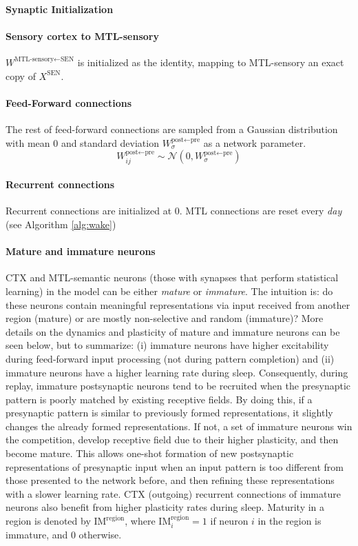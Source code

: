 \documentclass{article}
\begin{document}
\paragraph{Synaptic Initialization}
\paragraph{Sensory cortex to MTL-sensory}
$W^{\textrm{MTL-sensory}\leftarrow\textrm{SEN}}$ is initialized as the identity, mapping to MTL-sensory an exact copy of $X^\textrm{SEN}$.
\paragraph{Feed-Forward connections}
The rest of feed-forward connections are sampled from a Gaussian distribution with mean 0 and standard deviation $W^{\textrm{post}\leftarrow\textrm{pre}}_\sigma$ as a network parameter.
\begin{equation}
    W^{\textrm{post}\leftarrow\textrm{pre}}_{ij} \sim \mathcal{N}(0, W^{\textrm{post}\leftarrow\textrm{pre}}_\sigma)
\end{equation}
\paragraph{Recurrent connections}
Recurrent connections are initialized at 0. MTL connections are reset every \textit{day} (see Algorithm \ref{alg:wake})
\paragraph{Mature and immature neurons} CTX and MTL-semantic neurons (those with synapses that perform statistical learning) in the model can be either \textit{mature} or \textit{immature}. The intuition is: do these neurons contain meaningful representations via input received from another region (mature) or are mostly non-selective and random (immature)? More details on the dynamics and plasticity of mature and immature neurons can be seen below, but to summarize: (i) immature neurons have higher excitability during feed-forward input processing (not during pattern completion) and (ii) immature neurons have a higher learning rate during sleep. Consequently, during replay, immature postsynaptic neurons tend to be recruited when the presynaptic pattern is poorly matched by existing receptive fields. By doing this, if a presynaptic pattern is similar to previously formed representations, it slightly changes the already formed representations. If not, a set of immature neurons win the competition, develop receptive field due to their higher plasticity, and then become mature. This allows one-shot formation of new postsynaptic representations of presynaptic input when an input pattern is too different from those presented to the network before, and then refining these representations with a slower learning rate. CTX (outgoing) recurrent connections of immature neurons also benefit from higher plasticity rates during sleep. Maturity in a region is denoted by $\textrm{IM}^\textrm{region}$, where $\textrm{IM}^\textrm{region}_i = 1$ if neuron $i$ in the region is immature, and 0 otherwise.
\end{document}
